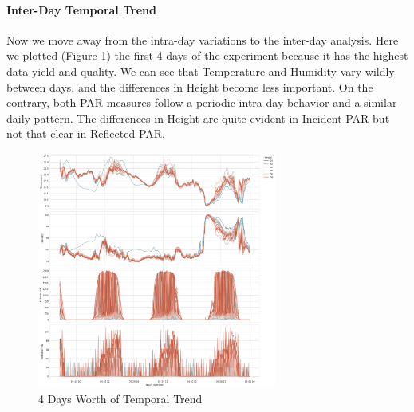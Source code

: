 \documentclass[11pt, letterpaper]{article}
\begin{document}
\paragraph{Inter-Day Temporal Trend}
Now we move away from the intra-day variations to the inter-day analysis. Here we plotted (Figure \ref{fig:ts_trend}) the first 4 days of the experiment because it has the highest data yield and quality. We can see that Temperature and Humidity vary wildly between days, and the differences in Height become less important. On the contrary, both PAR measures follow a periodic intra-day behavior and a similar daily pattern. The differences in Height are quite evident in Incident PAR but not that clear in Reflected PAR.
\begin{figure}[h!]
\centering
\includegraphics[width=0.7\textwidth]{eda_3.4.png}
\captionsetup{justification=centering}
\caption{4 Days Worth of Temporal Trend}
\label{fig:ts_trend}
\end{figure}
\end{document}
